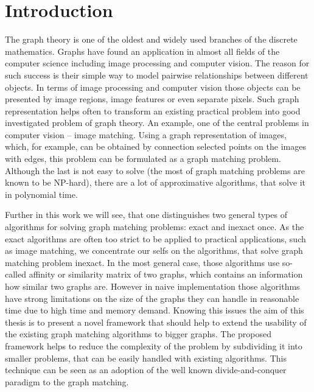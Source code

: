 \chapter{Introduction}
The graph theory is one of the oldest and widely used branches of the discrete mathematics. Graphs have found an application in almost all fields of the computer science including image processing and computer vision. The reason for such success is their simple way to model pairwise relationships between different objects. In terms of image processing and computer vision those objects can be presented by image regions, image features or even separate pixels. Such graph representation helps often to transform an existing practical problem into good investigated problem of graph theory. An example, one of the central problems in computer vision -- image matching. %
Using a graph representation of images, which, for example, can be obtained by connection selected points on the images with edges, this problem can be formulated as a graph matching problem. Although the last is not easy to solve (the most of graph matching problems are known to be NP-hard), there are a lot of approximative algorithms, that solve it in polynomial time.

Further in this work we will see, that one distinguishes two general types of algorithms for solving graph matching problems: exact and inexact once. As the exact algorithms are often too strict to be applied to practical applications, such as image matching, we concentrate our selfs on the algorithms, that solve graph matching problem inexact.
In the most general case, those algorithms use so-called affinity or similarity matrix of two graphs, which contains an information how similar two graphs are.
However in naive implementation those algorithms have strong limitations on the size of the graphs they can handle in reasonable time due to high time and memory demand. Knowing this issues the aim of this thesis is to present a novel framework that should help to extend the usability of the existing graph matching algorithms to bigger graphs. The proposed framework helps to reduce the complexity of the problem by subdividing it into smaller problems, that can be easily handled with existing algorithms. This technique can be seen as an adoption of the well known divide-and-conquer paradigm to the graph matching.

